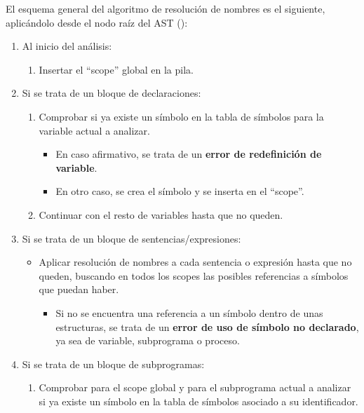 \vspace{0.5cm}
El esquema general del algoritmo de resolución de nombres es el siguiente, aplicándolo desde el nodo raíz del AST ():
\begin{enumerate}
    \item Al inicio del análisis:
    \begin{enumerate}
        \item Insertar el ``scope'' global en la pila.
    \end{enumerate}
    \item Si se trata de un bloque de declaraciones:
    \begin{enumerate}
        \item Comprobar si ya existe un símbolo en la tabla de símbolos para la variable actual a analizar.
        \begin{itemize}
            \item En caso afirmativo, se trata de un \textbf{error de redefinición de variable}.
            \item En otro caso, se crea el símbolo y se inserta en el ``scope''.
        \end{itemize}
        \item Continuar con el resto de variables hasta que no queden.
    \end{enumerate}
    \item Si se trata de un bloque de sentencias/expresiones:
    \begin{itemize}
        \item Aplicar resolución de nombres a cada sentencia o expresión hasta que no queden, buscando en todos los scopes las posibles referencias a símbolos que puedan haber.
        \begin{itemize}
            \item Si no se encuentra una referencia a un símbolo dentro de unas estructuras, se trata de un \textbf{error de uso de símbolo no declarado}, ya sea de variable, subprograma o proceso.
        \end{itemize}
    \end{itemize}
    \item Si se trata de un bloque de subprogramas:
    \begin{enumerate}
        \item Comprobar para el scope global y para el subprograma actual a analizar si ya existe un símbolo en la tabla de símbolos asociado a su identificador.
        \begin{itemize}

\end{itemize}
\end{enumerate}
\end{enumerate}
